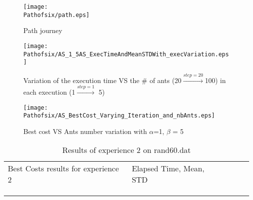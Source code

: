 \begin{figure}[H]
		\begin{minipage}[t]{0.45\linewidth}
		\centering
		\texttt{[image: \\Pathofsix/path.eps]}
		\caption{Path journey}\label{fig:Pathofsix:path}
		
		\end{minipage}\hfill
		\begin{minipage}[t]{0.45\linewidth}
		\centering
		\texttt{[image: \\Pathofsix/AS\_1\_5AS\_ExecTimeAndMeanSTDWith\_execVariation.eps]}
		\caption{Variation of the execution time VS the \# of ants (20$\stackrel{step=20}{\rightarrow}$100) in each execution (1$\stackrel{step=1}{\rightarrow}$ 5)}
		\label{fig:Pathofsix:AS_1_5AS_ExecTimeAndMeanSTDWith_execVariation}
		\end{minipage}
		\flushleft
		\begin{minipage}[t]{0.45\linewidth}
		\centering
		\texttt{[image: \\Pathofsix/AS\_BestCost\_Varying\_Iteration\_and\_nbAnts.eps]}
		\caption{Best cost VS Ants number variation with $\alpha$=1, $ \beta $ = 5}
		\label{fig:Pathofsix:AS_BestCost_Varying_Iteration_and_nbAnts}
		\end{minipage}
\end{figure}
		\begin{minipage}[t]{0.9\linewidth}
		\vspace{-9mm}
		\begin{table}[H]
		\label{tab:Pathofsix:expdeux}
		\begin{tabular}{lllll}
		\cline{1-2}
		\multicolumn{1}{|l|}{Best Costs results for experience 2}                                                           &  \multicolumn{1}{l|}{Elapsed Time, Mean, STD}                                             &  &  &  \\ \cline{1-2}
		\multicolumn{1}{|l|}{} & \multicolumn{1}{l|}{ } &  &  &  \\ \cline{1-2}
																						  &                                                                     &  &  &  \\
																						  &                                                                     &  &  & 
		\end{tabular}
		\caption{Results of experience 2 on rand60.dat}
		\end{table}
		\end{minipage}	
